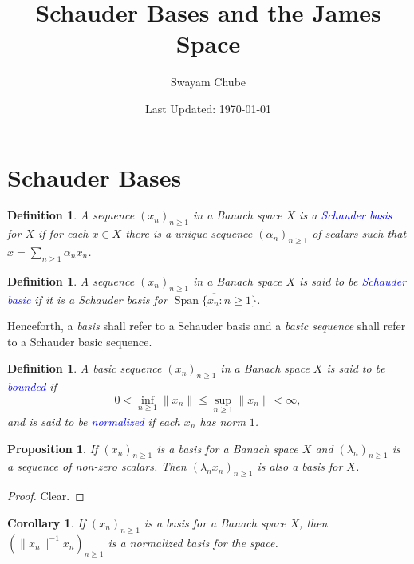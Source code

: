 \documentclass[11pt]{article}
\title{Schauder Bases and the James Space}
\author{Swayam Chube}
\date{Last Updated: \today}
\theoremstyle{thmstyle}
\newtheorem{proposition}[theorem]{Proposition}
\theoremstyle{defstyle}
\newtheorem{definition}[theorem]{Definition}
\newtheorem{corollary}[theorem]{Corollary}
\newcommand{\Span}{\operatorname{Span}}
\newcommand{\define}[1]{\textcolor{blue}{\textit{#1}}}
\renewcommand{\le}{\leqslant}
\renewcommand{\ge}{\geqslant}
\begin{document}
\maketitle 


\section{Schauder Bases}

\begin{definition}
  A \emph{sequence} $(x_n)_{n\ge 1}$ in a Banach space $X$ is a \define{Schauder basis} for $X$ if for each $x\in X$ there is a \emph{unique} sequence $(\alpha_n)_{n\ge 1}$ of scalars such that $\displaystyle x = \sum_{n\ge 1} \alpha_n x_n$.
\end{definition}

\begin{definition}
	A sequence $(x_n)_{n\ge 1}$ in a Banach space $X$ is said to be \define{Schauder basic} if it is a Schauder basis for $\overline{\Span\{x_n\colon n\ge 1\}}$.
\end{definition}

Henceforth, a \emph{basis} shall refer to a Schauder basis and a \emph{basic sequence} shall refer to a Schauder basic sequence.

\begin{definition}
	A basic sequence $(x_n)_{n\ge 1}$ in a Banach space $X$ is said to be \define{bounded} if 
	\begin{equation*}
		0 < \inf_{n\ge 1} \|x_n\|\le\sup_{n\ge 1}\|x_n\| < \infty,
	\end{equation*}
	and is said to be \define{normalized} if each $x_n$ has norm $1$. 
\end{definition}

\begin{proposition}
	If $(x_n)_{n\ge 1}$ is a basis for a Banach space $X$ and $(\lambda_n)_{n\ge 1}$ is a sequence of non-zero scalars. Then $\left(\lambda_n x_n\right)_{n\ge 1}$ is also a basis for $X$.
\end{proposition}
\begin{proof}
	Clear. 
\end{proof}

\begin{corollary}
	If $(x_n)_{n\ge 1}$ is a basis for a Banach space $X$, then $\left(\|x_n\|^{-1}x_n\right)_{n\ge 1}$ is a normalized basis for the space.
\end{corollary}
\end{document}
